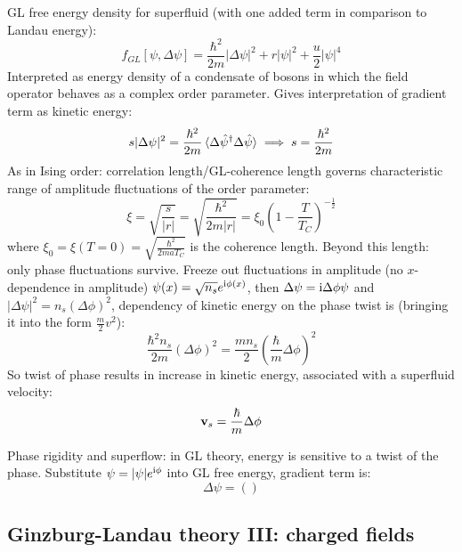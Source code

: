 \documentclass[../main.tex]{subfiles}
\begin{document}
GL free energy density for superfluid (with one added term in comparison to Landau energy):
\begin{equation}
    f_{GL} [\psi, \Delta \psi] = \frac{\hbar^2}{2m} \vert \Delta \psi \vert^2 + r \vert \psi \vert^2 + \frac{u}{2} \vert \psi \vert^4
\end{equation}
Interpreted as energy density of a condensate of bosons in which the field operator behaves as a complex order parameter.
Gives interpretation of gradient term as kinetic energy:
\begin{equation}
    s \vert \Delta \psi \vert^2 = \frac{\hbar^2}{2m} \braket{\Delta \hat{\psi}^{\dagger} \Delta \hat{\psi}} \implies s = \frac{\hbar^2}{2m}
\end{equation}
As in Ising order: correlation length/GL-coherence length governs characteristic range of amplitude fluctuations of the order parameter:
\begin{equation}
    \xi = \sqrt{\frac{s}{\vert r \vert}} = \sqrt{\frac{\hbar^2}{2m \vert r \vert}} = \xi_0 (1 - \frac{T}{T_C})^{-\frac{1}{2}}
\end{equation}
where \(\xi_0 = \xi(T=0) = \sqrt{\frac{\hbar^2}{2 m a T_C}}\) is the coherence length.
Beyond this length: only phase fluctuations survive.
Freeze out fluctuations in amplitude (no \(x\)-dependence in amplitude) \(\psi(x) = \sqrt{n_s} e^{\mathrm{i} \phi(x)}\), then \(\Delta \psi = \mathrm{i} \Delta \phi \psi\) and \(\vert \Delta \psi \vert^2 = n_s (\Delta \phi)^2\), dependency of kinetic energy on the phase twist is (bringing it into the form \(\frac{m}{2} v^2\)):
\begin{equation}
    \frac{\hbar^2 n_s}{2m} (\Delta \phi)^2 = \frac{m n_s}{2} (\frac{\hbar}{m} \Delta \phi)^2
\end{equation}
So twist of phase results in increase in kinetic energy, associated with a superfluid velocity:
\begin{equation}
    \bm{\mathrm{v}}_s = \frac{\hbar}{m} \Delta \phi
\end{equation}


Phase rigidity and superflow: in GL theory, energy is sensitive to a twist of the phase.
Substitute \(\psi = \vert \psi \vert e^{\mathrm{i} \phi}\) into GL free energy, gradient term is:
\begin{equation}
    \Delta \psi = ()
\end{equation}


\subsection{Ginzburg-Landau theory III: charged fields}

\end{document}
